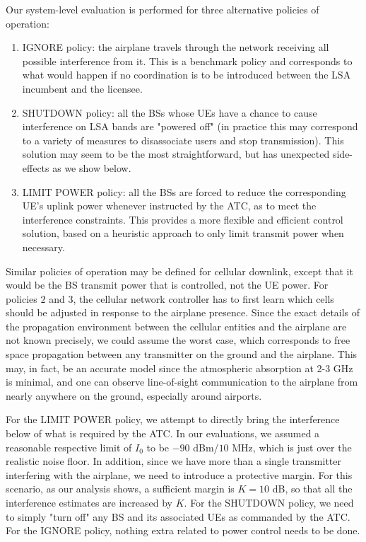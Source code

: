 \documentclass[journal]{IEEEtran}
\begin{document}
Our system-level evaluation is performed for three alternative policies of operation:

\begin{enumerate}
	\item IGNORE policy: the airplane travels through the network receiving all possible interference from it. This is a benchmark policy and corresponds to what would happen if no coordination is to be introduced between the LSA incumbent and the licensee.
	\item SHUTDOWN policy: all the BSs whose UEs have a chance to cause interference on LSA bands are "powered off" (in practice this may correspond to a variety of measures to disassociate users and stop transmission). This solution may seem to be the most straightforward, but has unexpected side-effects as we show below.
	\item LIMIT POWER policy: all the BSs are forced to reduce the corresponding UE's uplink power whenever instructed by the ATC, as to meet the interference constraints. This provides a more flexible and efficient control solution, based on a heuristic approach to only limit transmit power when necessary.
\end{enumerate}

Similar policies of operation may be defined for cellular downlink, except that it would be the BS transmit power that is controlled, not the UE power. For policies $2$ and $3$, the cellular network controller has to first learn which cells should be adjusted in response to the airplane presence. Since the exact details of the propagation environment between the cellular entities and the airplane are not known precisely, we could assume the worst case, which corresponds to free space propagation between any transmitter on the ground and the airplane. This may, in fact, be an accurate model since the atmospheric absorption at 2-3 GHz is minimal, and one can observe line-of-sight communication to the airplane from nearly anywhere on the ground, especially around airports.



For the LIMIT POWER policy, we attempt to directly bring the interference below of what is required by the ATC. In our evaluations, we assumed a reasonable respective limit of $I_0$ to be $-90$ dBm/$10$ MHz, which is just over the realistic noise floor. In addition, since we have more than a single transmitter interfering with the airplane, we need to introduce a protective margin. For this scenario, as our analysis shows, a sufficient margin is $K=10$ dB, so that all the interference estimates are increased by $K$. For the SHUTDOWN policy, we need to simply "turn off" any BS and its associated UEs as commanded by the ATC. For the IGNORE policy, nothing extra related to power control needs to be done.
\end{document}
